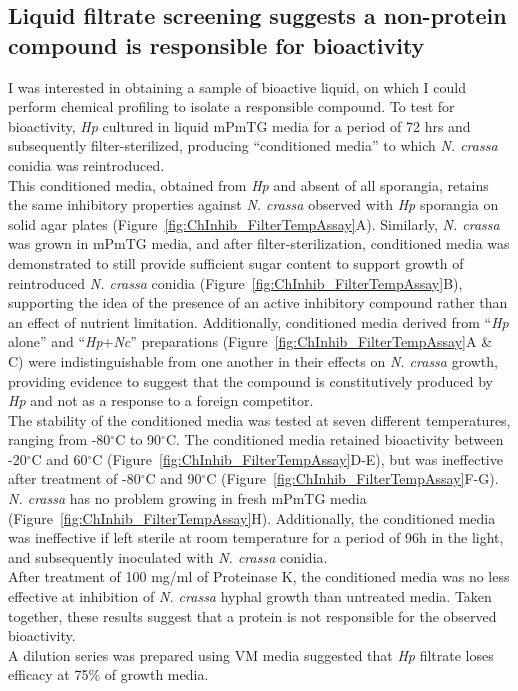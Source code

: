 \subsection*{Liquid filtrate screening suggests a non-protein compound is responsible for bioactivity}
I was interested in obtaining a sample of bioactive liquid, on which I could perform chemical profiling to isolate a responsible compound. To test for bioactivity, \textit{Hp} cultured in liquid mPmTG media for a period of 72 hrs and subsequently filter-sterilized, producing \enquote{conditioned media} to which \textit{N. crassa} conidia was reintroduced. \\
\indent This conditioned media, obtained from \textit{Hp} and absent of all sporangia, retains the same inhibitory properties against \textit{N. crassa} observed with \textit{Hp} sporangia on solid agar plates (Figure~\ref{fig:ChInhib_FilterTempAssay}A). Similarly, \textit{N. crassa} was grown in mPmTG media, and after filter-sterilization, conditioned media was demonstrated to still provide sufficient sugar content to support growth of reintroduced \textit{N. crassa} conidia (Figure~\ref{fig:ChInhib_FilterTempAssay}B), supporting the idea of the presence of an active inhibitory compound rather than an effect of nutrient limitation. Additionally, conditioned media derived from \enquote{\textit{Hp} alone} and \enquote{\textit{Hp}+\textit{Nc}} preparations (Figure~\ref{fig:ChInhib_FilterTempAssay}A \& C) were indistinguishable from one another in their effects on \textit{N. crassa} growth, providing evidence to suggest that the compound is constitutively produced by \textit{Hp} and not as a response to a foreign competitor. \\
\indent The stability of the conditioned media was tested at seven different temperatures, ranging from -80$^{\circ}$C to 90$^{\circ}$C. The conditioned media retained bioactivity between -20$^{\circ}$C and 60$^{\circ}$C (Figure~\ref{fig:ChInhib_FilterTempAssay}D-E), but was ineffective after treatment of -80$^{\circ}$C and 90$^{\circ}$C (Figure~\ref{fig:ChInhib_FilterTempAssay}F-G). \textit{N. crassa} has no problem growing in fresh mPmTG media (Figure~\ref{fig:ChInhib_FilterTempAssay}H). Additionally, the conditioned media was ineffective if left sterile at room temperature for a period of 96h in the light, and subsequently inoculated with \textit{N. crassa} conidia.\\
\indent After treatment of 100 mg/ml of Proteinase K, the conditioned media was no less effective at inhibition of \textit{N. crassa} hyphal growth than untreated media. Taken together, these results suggest that a protein is not responsible for the observed bioactivity.\\
\indent A dilution series was prepared using VM media suggested that \textit{Hp} filtrate loses efficacy at 75\% of growth media.\\

